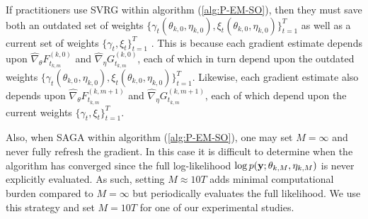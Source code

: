 If practitioners use SVRG within algorithm (\ref{alg:P-EM-SO}), then they must save both an outdated set of weights $\big\{\gamma_t(\theta_{k,0},\eta_{k,0}),\xi_t(\theta_{k,0},\eta_{k,0})\big\}_{t=1}^T$ as well as a current set of weights $\big\{ \gamma_t,\xi_t \big\}_{t=1}^T$ . This is because each gradient estimate depends upon $\widehat \nabla_\theta F_{t_{k,m}}^{(k,0)}$ and $\widehat \nabla_\eta G_{t_{k,m}}^{(k,0)}$, each of which in turn depend upon the outdated weights $\{\gamma_t(\theta_{k,0},\eta_{k,0}),\xi_t(\theta_{k,0},\eta_{k,0})\}_{t=1}^T$. Likewise, each gradient estimate also depends upon $\widehat \nabla_\theta F_{t_{k,m}}^{(k,m+1)}$ and $\widehat \nabla_\eta G_{t_{k,m}}^{(k,m+1)}$, each of which depend upon the current weights $\big\{ \gamma_t,\xi_t \big\}_{t=1}^T$.

Also, when SAGA within algorithm (\ref{alg:P-EM-SO}), one may set $M = \infty$ and never fully refresh the gradient. In this case it is difficult to determine when the algorithm has converged since the full log-likelihood $\log p(\mathbf{y};\theta_{k,M},\eta_{k,M})$ is never explicitly evaluated. As such, setting $M \approx 10T$ adds minimal computational burden compared to $M = \infty$ but periodically evaluates the full likelihood. We use this strategy and set $M = 10T$ for one of our experimental studies.

